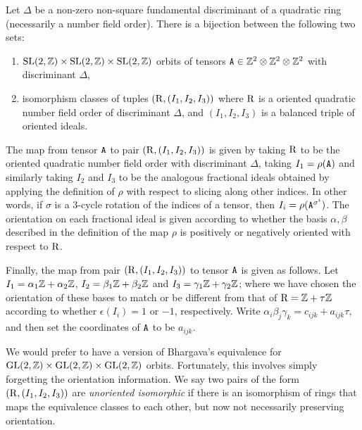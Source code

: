 \begin{theorem}
	\label{thm:bhargava}
	Let $\Delta$ be a non-zero non-square fundamental discriminant of a quadratic ring (necessarily a number field order).
There is a bijection between the following two sets:
\begin{enumerate}
	\item $\mathrm{SL}(2,\mathbb{Z}) \times \mathrm{SL}(2,\mathbb{Z}) \times \mathrm{SL}(2,\mathbb{Z})$ orbits of tensors $\mathtt{A} \in \mathbb{Z}^2 \otimes \mathbb{Z}^2 \otimes \mathbb{Z}^2$ with discriminant $\Delta$,
	\item isomorphism classes of tuples $(\mathrm{R}, (I_1, I_2, I_3))$ where $\mathrm{R}$ is a oriented quadratic number field order of discriminant $\Delta$, and $(I_1,I_2,I_3)$ is a balanced triple of oriented ideals.
\end{enumerate}

	The map from tensor $\mathtt{A}$ to pair $(\mathrm{R}, (I_1, I_2, I_3))$ is given by taking $\mathrm{R}$ to be the oriented quadratic number field order with discriminant $\Delta$, taking $I_1 = \rho(\mathtt{A})$ and similarly taking $I_2$ and $I_3$ to be the analogous fractional ideals obtained by applying the definition of $\rho$ with respect to slicing along other indices.  In other words, if $\sigma$ is a $3$-cycle rotation of the indices of a tensor, then $I_i = \rho(\mathtt{A}^{\sigma^i})$.  The orientation on each fractional ideal is given according to whether the basis $\alpha, \beta$ described in the definition of the map $\rho$ is positively or negatively oriented with respect to $\mathrm{R}$.

	Finally, the map from pair $(\mathrm{R}, (I_1,I_2,I_3))$ to tensor $\mathtt{A}$ is given as follows.  Let $I_1 = \alpha_1\mathbb{Z} + \alpha_2\mathbb{Z}$, $I_2 = \beta_1\mathbb{Z} + \beta_2\mathbb{Z}$ and $I_3 = \gamma_1\mathbb{Z} + \gamma_2\mathbb{Z}$; where we have chosen the orientation of these bases to match or be different from that of $\mathrm{R} = \mathbb{Z} + \tau \mathbb{Z}$ according to whether $\epsilon(I_i) = 1$ or $-1$, respectively.  Write $\alpha_i\beta_j\gamma_k = c_{ijk} + a_{ijk}\tau$, and then set the coordinates of $\mathtt{A}$ to be $a_{ijk}$.
\end{theorem}

We would prefer to have a version of Bhargava's equivalence for $\mathrm{GL}(2,\mathbb{Z})\times \mathrm{GL}(2,\mathbb{Z}) \times \mathrm{GL}(2,\mathbb{Z})$ orbits.  Fortunately, this involves simply forgetting the orientation information. We say two pairs of the form $(\mathrm{R}, (I_1, I_2, I_3))$ are \emph{unoriented isomorphic} if there is an isomorphism of rings that maps the equivalence classes to each other, but now not necessarily preserving orientation.

